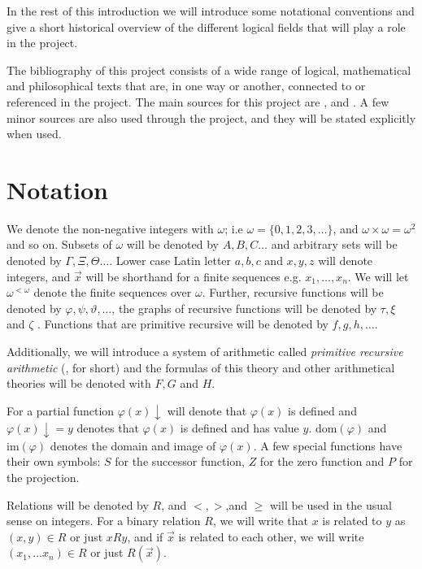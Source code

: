 \documentclass[../main.tex]{subfiles}
\begin{document}
In the rest of this introduction we will introduce some notational
conventions and give a short historical overview of the different logical
fields that will play a role in the project.

The bibliography of this project consists of a wide range of logical,
mathematical and philosophical texts that are, in one way or another, connected to or referenced in the project. 
The main sources for this project
are \parencite{Smor1985}, \parencite{Boolos1993} and \parencite{Soare1987}. A
few minor sources are also used through the project, and they will be stated
explicitly when used.

\section{Notation}

We denote the non-negative integers with $\omega$; i.e
$\omega=\{0,1,2,3,\ldots\}$, and $\omega\times\omega=\omega^2$ and so on.
Subsets of $\omega$ will be denoted by $A,B,C\ldots$ and arbitrary sets will be
denoted by
$\Gamma,\Xi,\Theta\ldots$. Lower case Latin letter $a,b,c$ and $x,y,z$ will
denote integers, and $\vec{x}$ will be shorthand for a finite sequences e.g. $x_1,\ldots,x_n$.
We will let $\omega^{<\omega}$ denote the finite sequences over $\omega$.
Further, recursive functions will be denoted by
$\varphi,\psi,\vartheta,\ldots$, the graphs of recursive functions will be
denoted by $\tau,\xi$ and $\zeta$ . Functions that are primitive recursive will be denoted by
$f,g,h,\ldots$. 

Additionally, we  will introduce a system of arithmetic called \textit{primitive
recursive arithmetic} (\PRA, for short) and the formulas of this
theory and other arithmetical theories  will be denoted with $F,G$ and $H$.

For a partial function $\varphi(x)\downarrow$ will denote that $\varphi(x)$ is defined and
$\varphi(x)\downarrow=y$ denotes that $\varphi(x)$ is defined and has value $y$.
 $\text{dom}(\varphi)$ and $\text{im}
(\varphi)$ denotes the
domain and image of $\varphi(x)$.
A few special functions have their own symbols: $S$ for the
successor function, $Z$ for the zero function and $P$ for the projection.


Relations will be denoted by $R$, and $<,>$,\leq and $\geq$ will be used in the usual
sense on integers. For a binary relation $R$, we will write that $x$ is related
to $y$ as  $(x,y)\in R$ or just $xRy$, and if $\vec x$ is related to each other, we
will write $(x_1,\ldots x_n)\in R$ or just $R(\vec x)$.
\end{document}

